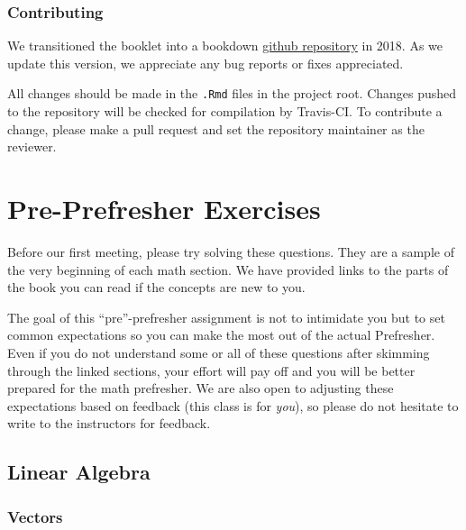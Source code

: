 \documentclass[]{book}
\theoremstyle{definition}
\theoremstyle{definition}
\theoremstyle{definition}
\theoremstyle{remark}
\begin{document}
\hypertarget{contributing}{%
\subsection*{Contributing}\label{contributing}}

We transitioned the booklet into a bookdown \href{https://github.com/IQSS/prefresher}{github repository} in 2018. As we update this version, we appreciate any bug reports or fixes appreciated.

All changes should be made in the \texttt{.Rmd} files in the project root. Changes pushed to the repository will be checked for compilation by Travis-CI. To contribute a change, please make a pull request and set the repository maintainer as the reviewer.

\hypertarget{pre-prefresher-exercises}{%
\chapter*{Pre-Prefresher Exercises}\label{pre-prefresher-exercises}}

Before our first meeting, please try solving these questions. They are a sample of the very beginning of each math section. We have provided links to the parts of the book you can read if the concepts are new to you.

The goal of this ``pre''-prefresher assignment is not to intimidate you but to set common expectations so you can make the most out of the actual Prefresher. Even if you do not understand some or all of these questions after skimming through the linked sections, your effort will pay off and you will be better prepared for the math prefresher. We are also open to adjusting these expectations based on feedback (this class is for \emph{you}), so please do not hesitate to write to the instructors for feedback.

\hypertarget{linear-algebra}{%
\section*{Linear Algebra}\label{linear-algebra}}

\hypertarget{vectors}{%
\subsection*{Vectors}\label{vectors}}
\end{document}
